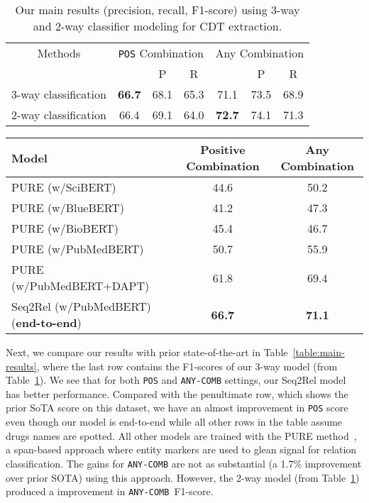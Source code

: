 \documentclass[conference]{IEEEtran}
\begin{document}
\begin{table}[h]
\centering
\renewcommand{\arraystretch}{1.4}
\caption{Our main results (precision, recall, F1-score) using 3-way and 2-way classifier modeling for CDT extraction.}
\label{2-way}
\begin{tabular}{lcccccc}
\toprule
\multicolumn{1}{c}{Methods} & \multicolumn{3}{c}{\texttt{POS} Combination} & \multicolumn{3}{c}{Any Combination} \\
 &  & P & R &  & P & R\\\midrule
3-way classification  & \textbf{66.7} & 68.1 & 65.3 & 71.1 & 73.5 & 68.9 \\
2-way classification & 66.4 & 69.1 & 64.0 & \textbf{72.7} & 74.1 & 71.3  \\
\bottomrule
\end{tabular}


\end{table}

\begin{table*}[!ht] 
  \centering
  \renewcommand{\arraystretch}{1.4}
    \caption{Our results (last row) compared with different baseline foundation models (DAPT means with continued domain-adaptive pretraining~\cite{gururangan-etal-2020-dont}) trained with the PURE method \cite{zhong-chen-2021-frustratingly}. The baseline results (first 5 rows) are from Tiktinsky et al.~\cite{tiktinsky-etal-2022-dataset}.
  }
  \begin{tabular}{lcc} 
  \toprule
  \textbf{Model} & \multicolumn{1}{c}{\textbf{Positive Combination }} & \multicolumn{1}{c}{\textbf{Any Combination }}\\\midrule
  PURE (w/SciBERT)  & 44.6  & 50.2\\ 
  PURE (w/BlueBERT)  & 41.2  & 47.3\\ 
  PURE (w/BioBERT)  & 45.4  & 46.7\\ 
  PURE (w/PubMedBERT)  & 50.7  & 55.9\\ \bottomrule
  PURE (w/PubMedBERT+DAPT)  & 61.8  & 69.4\\ \bottomrule
  Seq2Rel (w/PubMedBERT) (\textbf{\color{blue}end-to-end})& \textbf{66.7}  & \textbf{71.1}\\
  \bottomrule
  \end{tabular}
   \label{table:main-results}
\end{table*}

Next, we compare our results with prior state-of-the-art  in Table~\ref{table:main-results}, where the last row contains the F1-scores of our 3-way model (from Table~\ref{2-way}).
We  see that for both \texttt{POS} and \texttt{ANY-COMB} settings, our Seq2Rel model has better performance. Compared with the penultimate row, which shows the prior SoTA score on this dataset, we have an almost  improvement in \texttt{POS} score even though our model is end-to-end while all other rows in the table assume drugs names are spotted.  All other models are trained with the PURE method~\cite{zhong-chen-2021-frustratingly}, a span-based approach where entity markers are   used to glean signal for relation classification. The gains for \texttt{ANY-COMB} are not as substantial (a 1.7\% improvement over prior SOTA) using this approach. However, the 2-way model (from Table~\ref{2-way}) produced a  improvement in \texttt{ANY-COMB}~F1-score. 
\end{document}

